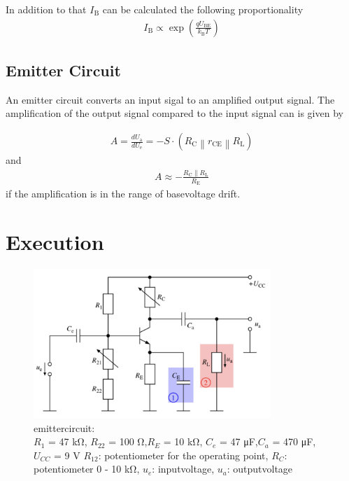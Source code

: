 \documentclass[11pt, a4paper]{article}
\begin{document}
In addition to that $I_{\mathrm{B}}$ can be calculated the following proportionality 
\begin{align}
    I_{\mathrm{B}} \propto \exp \left(\frac{q U_{\mathrm{BE}}}{k_{\mathrm{B}} T}\right)
    \label{eq:Ib_T}
\end{align}

\FloatBarrier
\subsection{Emitter Circuit}
An emitter circuit converts an input sigal to an amplified output signal. The amplification of the output signal compared to the input signal can is given by


\begin{align}
    A=\frac{d U_{\mathrm{a}}}{d U_{\mathrm{e}}}=-S \cdot\left(R_{\mathrm{C}}\left\|r_{\mathrm{CE}}\right\| R_{\mathrm{L}}\right)
    \label{eq:ampEasy}
\end{align}
and 
\begin{align}
A \approx-\frac{R_{\mathrm{C}} \| R_{\mathrm{L}}}{R_{\mathrm{E}}}
\label{eq:ampDrift}
\end{align}
if the amplification is in the range of basevoltage drift.
\section{Execution}
\begin{figure}[h]
    \centering
    \includegraphics[width=0.8\textwidth]{bilder/Emitter circuit.png}
    \caption{emittercircuit:\\
    $R_1$ = 47 \si{\kilo\ohm}, $R_{22}$ = 100 \si{\ohm},$R_E$ = 10 \si{\kilo\ohm}, $C_e$ = 47 \si{\micro\farad},$C_a$ = 470 \si{\micro\farad}, $U_{CC}$ = 9 \si{\volt} 
    $R_{12}$: potentiometer for the operating point, $R_C$: potentiometer 0 - 10 \si{\kilo\ohm}, $u_e$: inputvoltage, $u_a$: outputvoltage
    }
    \label{im:Emcir}
\end{figure}
\end{document}

